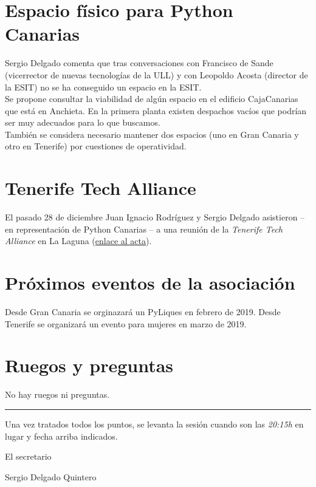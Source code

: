 \documentclass[a4paper, 12pt]{article}
\begin{document}
\section{Espacio físico para Python Canarias}

Sergio Delgado comenta que tras conversaciones con Francisco de Sande (vicerrector de nuevas tecnologías de la ULL) y con Leopoldo Acosta (director de la ESIT) no se ha conseguido un espacio en la ESIT.\\

Se propone consultar la viabilidad de algún espacio en el edificio CajaCanarias que está en Anchieta. En la primera planta existen despachos vacíos que podrían ser muy adecuados para lo que buscamos.\\

También se considera necesario mantener dos espacios (uno en Gran Canaria y otro en Tenerife) por cuestiones de operatividad.

\section{Tenerife Tech Alliance}

El pasado 28 de diciembre Juan Ignacio Rodríguez y Sergio Delgado asistieron -- en representación de Python Canarias -- a una reunión de la \textit{Tenerife Tech Alliance} en La Laguna (\href{https://docs.google.com/document/d/1l8pVGLe_IQY4QCnvm1t4-mjPD1-L817cCCf1quSOhmc/edit?usp=sharing}{enlace al acta}).

\section{Próximos eventos de la asociación}

Desde Gran Canaria se orginazará un PyLiques en febrero de 2019. Desde Tenerife se organizará un evento para mujeres en marzo de 2019.

\section{Ruegos y preguntas}

No hay ruegos ni preguntas.


\vspace{1cm}
\hrule
\vspace{3mm}

Una vez tratados todos los puntos, se levanta la sesión cuando son las \textit{20:15h} en lugar y fecha arriba indicados.

\begin{flushright}
El secretario

Sergio Delgado Quintero
\end{flushright}
\end{document}
